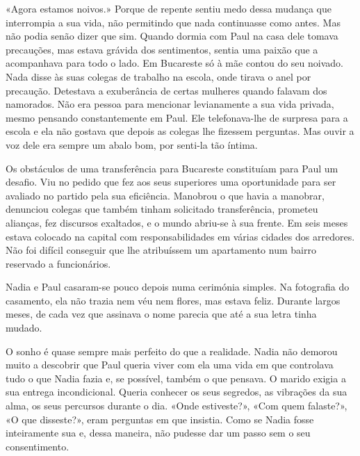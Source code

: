 «Agora estamos noivos.» Porque de repente sentiu medo dessa mudança que
interrompia a sua vida, não permitindo que nada continuasse como antes.
Mas não podia senão dizer que sim. Quando dormia com Paul na casa dele
tomava precauções, mas estava grávida dos sentimentos, sentia uma paixão
que a acompanhava para todo o lado. Em Bucareste só à mãe contou do seu
noivado. Nada disse às suas colegas de trabalho na escola, onde tirava o
anel por precaução. Detestava a exuberância de certas mulheres quando
falavam dos namorados. Não era pessoa para mencionar levianamente a sua
vida privada, mesmo pensando constantemente em Paul. Ele telefonava-lhe
de surpresa para a escola e ela não gostava que depois as colegas lhe
fizessem perguntas. Mas ouvir a voz dele era
sempre um abalo bom, por senti-la tão íntima.

Os obstáculos de uma transferência para Bucareste constituíam para Paul
um desafio. Viu no pedido que fez
aos seus superiores uma oportunidade para ser avaliado no partido pela
sua eficiência. Manobrou o que havia a manobrar, denunciou colegas que
também tinham solicitado transferência, prometeu alianças, fez
discursos exaltados, e o mundo abriu-se à sua frente. Em seis meses
estava colocado na capital com responsabilidades em várias cidades dos
arredores. Não foi difícil conseguir que lhe atribuíssem um apartamento
num bairro reservado a funcionários.

Nadia e Paul casaram-se pouco depois numa cerimónia simples. Na
fotografia do casamento, ela não trazia nem véu nem flores, mas estava
feliz. Durante largos meses, de cada vez que assinava o nome parecia que
até a sua letra tinha mudado.

O sonho é quase sempre mais perfeito do que a realidade. Nadia não
demorou muito a descobrir que Paul queria viver com ela uma vida em que
controlava tudo o que Nadia fazia e, se possível, também o que pensava.
O marido exigia a sua entrega incondicional. Queria conhecer os seus
segredos, as vibrações da sua alma, os seus percursos durante o dia.
«Onde estiveste?», «Com quem falaste?», «O que disseste?», eram
perguntas em que insistia. Como se Nadia fosse inteiramente sua e,
dessa maneira, não pudesse dar um passo sem o seu consentimento.

